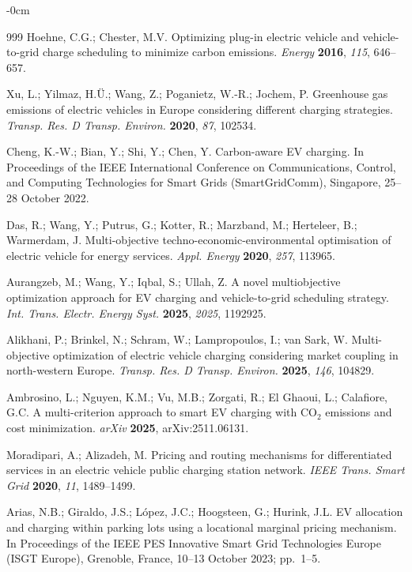 \documentclass[sustainability,article,submit,moreauthors,pdftex]{Definitions/mdpi}
\begin{document}
\begin{adjustwidth}{-\extralength}{0cm}
\begin{thebibliography}{999}
Hoehne, C.G.; Chester, M.V.
Optimizing plug-in electric vehicle and vehicle-to-grid charge
scheduling to minimize carbon emissions.
\textit{Energy} \textbf{2016}, \textit{115}, 646--657.

Xu, L.; Yilmaz, H.\"U.; Wang, Z.; Poganietz, W.-R.; Jochem, P.
Greenhouse gas emissions of electric vehicles in Europe considering
different charging strategies.
\textit{Transp. Res. D Transp. Environ.} \textbf{2020}, \textit{87}, 102534.

Cheng, K.-W.; Bian, Y.; Shi, Y.; Chen, Y.
Carbon-aware EV charging.
In Proceedings of the IEEE International Conference on Communications,
Control, and Computing Technologies for Smart Grids (SmartGridComm),
Singapore, 25--28 October 2022.

Das, R.; Wang, Y.; Putrus, G.; Kotter, R.; Marzband, M.; Herteleer, B.;
Warmerdam, J.
Multi-objective techno-economic-environmental optimisation of electric
vehicle for energy services.
\textit{Appl. Energy} \textbf{2020}, \textit{257}, 113965.

Aurangzeb, M.; Wang, Y.; Iqbal, S.; Ullah, Z.
A novel multiobjective optimization approach for EV charging and
vehicle-to-grid scheduling strategy.
\textit{Int. Trans. Electr. Energy Syst.} \textbf{2025}, \textit{2025}, 1192925.

Alikhani, P.; Brinkel, N.; Schram, W.; Lampropoulos, I.; van Sark, W.
Multi-objective optimization of electric vehicle charging considering
market coupling in north-western Europe.
\textit{Transp. Res. D Transp. Environ.} \textbf{2025}, \textit{146}, 104829.

Ambrosino, L.; Nguyen, K.M.; Vu, M.B.; Zorgati, R.; El Ghaoui, L.;
Calafiore, G.C.
A multi-criterion approach to smart EV charging with CO$_2$ emissions
and cost minimization.
\textit{arXiv} \textbf{2025}, arXiv:2511.06131.

Moradipari, A.; Alizadeh, M.
Pricing and routing mechanisms for differentiated services in an
electric vehicle public charging station network.
\textit{IEEE Trans. Smart Grid} \textbf{2020}, \textit{11}, 1489--1499.

Arias, N.B.; Giraldo, J.S.; L\'{o}pez, J.C.; Hoogsteen, G.; Hurink, J.L.
EV allocation and charging within parking lots using a locational
marginal pricing mechanism.
In Proceedings of the IEEE PES Innovative Smart Grid Technologies Europe
(ISGT Europe), Grenoble, France, 10--13 October 2023; pp.\ 1--5.


\end{thebibliography}
\end{adjustwidth}
\end{document}
